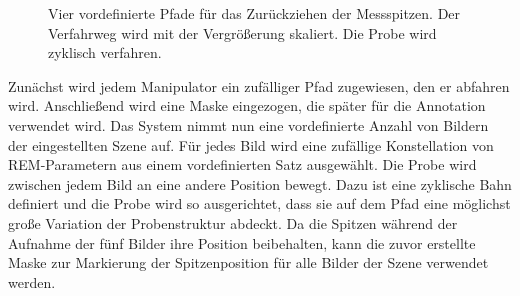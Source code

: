 \begin{figure}[htbp]
{}
  \caption{Vier vordefinierte Pfade für das Zurückziehen der Messspitzen. Der Verfahrweg wird mit der Vergrößerung skaliert. Die Probe wird zyklisch verfahren.}
  \label{fig:pathmanip}
\end{figure}

Zunächst wird jedem Manipulator ein zufälliger Pfad zugewiesen, den er abfahren wird. Anschließend wird eine Maske eingezogen, die später für die Annotation verwendet wird.
Das System nimmt nun eine vordefinierte Anzahl von Bildern der eingestellten Szene auf. Für jedes Bild wird eine zufällige Konstellation von REM-Parametern aus einem vordefinierten Satz ausgewählt. Die Probe wird zwischen jedem Bild an eine andere Position bewegt. Dazu ist eine zyklische Bahn definiert und die Probe wird so ausgerichtet, dass sie auf dem Pfad eine möglichst große Variation der Probenstruktur abdeckt. Da die Spitzen während der Aufnahme der fünf Bilder ihre Position beibehalten, kann die zuvor erstellte Maske zur Markierung der Spitzenposition für alle Bilder der Szene verwendet werden.

